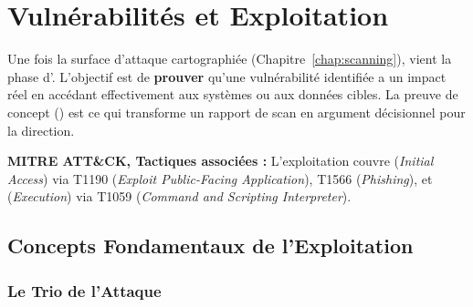
\chapter{Vulnérabilités et Exploitation}
\label{chap:exploit}

Une fois la surface d'attaque cartographiée (Chapitre~\ref{chap:scanning}),
vient la phase d'. L'objectif est de \textbf{prouver}
qu'une vulnérabilité identifiée a un impact réel en accédant effectivement
aux systèmes ou aux données cibles. La preuve de concept () est
ce qui transforme un rapport de scan en argument décisionnel pour la direction.

\begin{boxinfo}
\textbf{MITRE ATT\&CK, Tactiques associées :}
L'exploitation couvre  (\textit{Initial Access}) via T1190
(\textit{Exploit Public-Facing Application}), T1566 (\textit{Phishing}),
et  (\textit{Execution}) via T1059
(\textit{Command and Scripting Interpreter}).
\end{boxinfo}

\section{Concepts Fondamentaux de l'Exploitation}
\label{sec:exploit_concepts}

\subsection{Le Trio de l'Attaque}
\label{subsec:trio_attaque}

